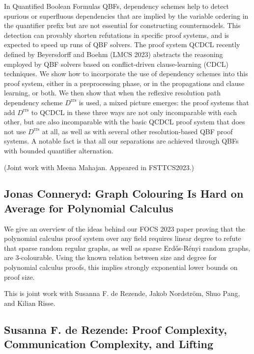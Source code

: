 \documentclass[11pt]{article}
\begin{document}
In Quantified Boolean Formulas QBFs, dependency schemes help
to detect spurious or superfluous dependencies that are implied by the
variable ordering in the quantifier prefix but are not essential for
constructing countermodels. This detection can provably shorten
refutations in specific proof systems, and is expected to speed up
runs of QBF solvers. The proof system QCDCL recently defined by
Beyersdorff and Boehm (LMCS 2023) abstracts the reasoning employed by
QBF solvers based on conflict-driven clause-learning (CDCL)
techniques. We show how to incorporate the use of dependency schemes
into this proof system, either in a preprocessing phase, or in the
propagations and clause learning, or both. We then show that when the
reflexive resolution path dependency scheme $D^{\mathrm{rrs}}$ is used, a mixed
picture emerges: the proof systems that add $D^{\mathrm{rrs}}$ to QCDCL in these
three ways are not only incomparable with each other, but are also
incomparable with the basic QCDCL proof system that does not use $D^{\mathrm{rrs}}$
at all, as well as with several other resolution-based QBF proof
systems. A notable fact is that all our separations are achieved
through QBFs with bounded quantifier alternation.

(Joint work with Meena Mahajan. Appeared in FSTTCS2023.)


\subsection*{Jonas Conneryd: Graph Colouring Is Hard on Average for Polynomial Calculus}\label{Conneryd}

We give an overview of the ideas behind our FOCS 2023 paper proving that the polynomial calculus proof system over any field requires linear degree to refute that sparse random regular graphs, as well as sparse Erd\H{o}s-R\'{e}nyi random graphs, are $3$-colourable. Using the known relation between size and degree for polynomial calculus proofs, this implies strongly exponential lower bounds on proof size.

This is joint work with Susanna F. de Rezende, Jakob Nordström, Shuo Pang, and Kilian Risse. 

\subsection*{Susanna F. de Rezende:
  Proof Complexity, Communication Complexity, and Lifting   
}\label{Rezende}
\end{document}
